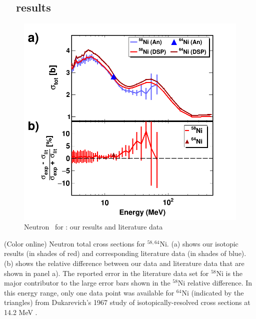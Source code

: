 \subsection{\niEightFour\ \tot\ results}
\begin{figure}
    \includegraphics[scale=0.35]{figures/TwoPanelNi.png}
    \caption{Neutron \tot\ for \niEightFour: our results and literature data}
    \label{TwoPanelNi}
\end{figure}

(Color online) Neutron total cross sections for $^{58,64}$Ni.
        (a) shows our isotopic results (in shades of red) and
        corresponding literature data \cite{Perey1993, Dukarevich1967} (in
        shades of blue). (b) shows the relative difference between our data
        and literature data that are shown in panel a). The reported error in
        the literature data set for $^{58}$Ni is the major contributor to the
        large error bars shown in the $^{58}$Ni relative difference. In this
        energy range, only one data point was available for $^{64}$Ni (indicated
        by the triangles) from Dukarevich's 1967 study of isotopically-resolved cross
        sections at 14.2 MeV \cite{Dukarevich1967}.

